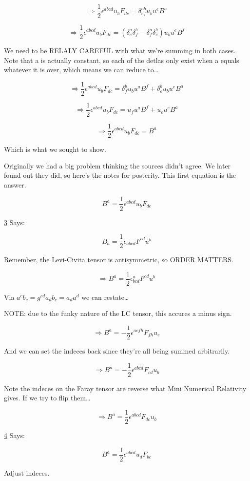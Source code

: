 \documentclass[landscape,letterpaper,10pt,english]{article}
\begin{document}
\[ \Rightarrow \frac12 \epsilon^{abcd}u_bF_{dc} = \delta^{ab}_{ef} u_bu^e B^a \]

\[ \Rightarrow \frac12 \epsilon^{abcd}u_bF_{dc} = (\delta^a_e \delta^b_f - \delta^a_f \delta^b_e) u_bu^eB^f \]

We need to be RELALY CAREFUL with what we're summing in both cases. Note
that a is actually constant, so each of the detlas only exist when a
equals whatever it is over, which means we can reduce to\ldots{}

\[ \Rightarrow \frac12 \epsilon^{abcd}u_bF_{dc} =  \delta^b_f u_bu^aB^f + \delta^b_e u_bu^eB^a \]

\[ \Rightarrow \frac12 \epsilon^{abcd}u_bF_{dc} =  u_fu^aB^f + u_eu^eB^a \]

\[ \Rightarrow \frac12 \epsilon^{abcd}u_bF_{dc} =  B^a \]

Which is what we sought to show.

    Originally we had a big problem thinking the sources didn't agree. We
later found out they did, so here's the notes for posterity. This first
equation is the answer.

\[ B^a = \frac12 \epsilon^{abcd}u_bF_{dc} \]

\hyperref[3]{3} Says:

\[ B_a = \frac12 \epsilon_{abcd} F^{cd} u^b \]

Remember, the Levi-Civita tensor is antisymmetric, so ORDER MATTERS.

\[ \Rightarrow B^a = \frac12 \epsilon^a_{bcd} F^{cd} u^b \]

Via \(a^cb_c = g^{cd} a_db_c = a_da^d\) we can restate\ldots{}

NOTE: due to the funky nature of the LC tensor, this accures a minus
sign.

\[ \Rightarrow B^a = - \frac12 \epsilon^{aefh} F_{fh} u_e \]

And we can set the indeces back since they're all being summed
arbitrarily.

\[ \Rightarrow B^a = - \frac12 \epsilon^{abcd} F_{cd} u_b \]

Note the indeces on the Faray tensor are reverse what Mini Numerical
Relativity gives. If we try to flip them\ldots{}

\[ \Rightarrow B^a = \frac12 \epsilon^{abcd} F_{dc} u_b \]

\hyperref[4]{4} Says:

\[ B^a = \frac12 \epsilon^{abcd}u_dF_{bc} \]

Adjust indeces.
\end{document}
